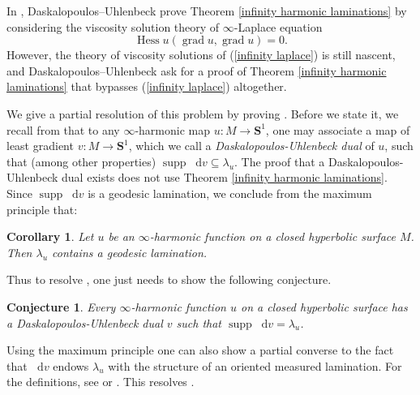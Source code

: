 \documentclass[reqno,10pt]{amsart}
\newcommand{\Sph}{\mathbf S}
\DeclareMathOperator{\Hess}{Hess}
\DeclareMathOperator{\supp}{supp}
\newcommand*\dif{\mathop{}\!\mathrm{d}}
\DeclareMathOperator{\grad}{grad}
\newcommand{\dfn}[1]{\emph{#1}\index{#1}}
\newtheorem{corollary}[theorem]{Corollary}
\newtheorem{conjecture}[theorem]{Conjecture}
\theoremstyle{definition}
\numberwithin{equation}{section}
\begin{document}
In \cite[\S5]{daskalopoulos2020transverse}, Daskalopoulos--Uhlenbeck prove Theorem \ref{infinity harmonic laminations} by considering the viscosity solution theory of $\infty$-Laplace equation
\begin{equation}\label{infinity laplace}
    \Hess u(\grad u, \grad u) = 0.
\end{equation}
However, the theory of viscosity solutions of (\ref{infinity laplace}) is still nascent, and Daskalopoulos--Uhlenbeck ask \cite[Problem 9.5]{daskalopoulos2020transverse} for a proof of Theorem \ref{infinity harmonic laminations} that bypasses (\ref{infinity laplace}) altogether.

We give a partial resolution of this problem by proving \cite[Theorem-Conjecture 9.6]{daskalopoulos2020transverse}.
Before we state it, we recall from \cite[\S6]{daskalopoulos2020transverse} that to any $\infty$-harmonic map $u: M \to \Sph^1$, one may associate a map of least gradient $v: M \to \Sph^1$, which we call a \dfn{Daskalopoulos-Uhlenbeck dual} of $u$, such that (among other properties) $\supp \dif v \subseteq \lambda_u$.
The proof that a Daskalopoulos-Uhlenbeck dual exists does not use Theorem \ref{infinity harmonic laminations}.
Since $\supp \dif v$ is a geodesic lamination, we conclude from the maximum principle that:

\begin{corollary}\label{maximum stretch contains lamination}
Let $u$ be an $\infty$-harmonic function on a closed hyperbolic surface $M$.
Then $\lambda_u$ contains a geodesic lamination.
\end{corollary}

Thus to resolve \cite[Problem 9.5]{daskalopoulos2020transverse}, one just needs to show the following conjecture.

\begin{conjecture}\label{two laminations agree}
Every $\infty$-harmonic function $u$ on a closed hyperbolic surface has a Daskalopoulos-Uhlenbeck dual $v$ such that $\supp \dif v = \lambda_u$.
\end{conjecture}

Using the maximum principle one can also show a partial converse to the fact that $\dif v$ endows $\lambda_u$ with the structure of an oriented measured lamination.
For the definitions, see \cite[\S8]{daskalopoulos2020transverse} or \cite{Ruelle75}.
This resolves \cite[Problem 9.7]{daskalopoulos2020transverse}.
\end{document}
